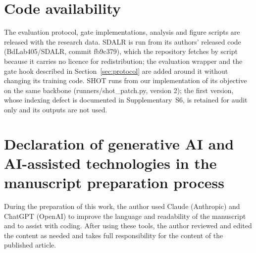 \section*{Code availability}

The evaluation protocol, gate implementations, analysis and figure scripts are released with the research data. SDALR is
run from its authors' released code (BdLab405/SDALR, commit fb9c379), which the repository fetches by script because
it carries no licence for redistribution; the evaluation wrapper and the gate hook described in Section~\ref{sec:protocol} are
added around it without changing its training code. SHOT runs from our implementation of its objective on the same backbone (runners/shot\_patch.py, version 2); the first version, whose indexing defect is documented in Supplementary~S6, is retained for audit only and its outputs are not used.

\section*{Declaration of generative AI and AI-assisted technologies in the manuscript preparation process}

During the preparation of this work, the author used Claude (Anthropic) and ChatGPT (OpenAI) to improve the language and
readability of the manuscript and to assist with coding. After using these tools, the author reviewed and edited the content as
needed and takes full responsibility for the content of the published article.
